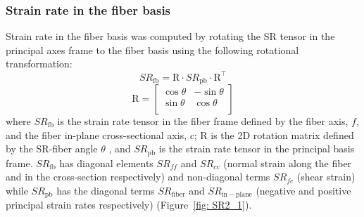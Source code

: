 \subsubsection{Strain rate in the fiber basis}
Strain rate in the fiber basis was computed by rotating the SR tensor in the principal axes frame to the fiber basis using the following rotational transformation:
\begin{equation}\label{eq: SR2_1}
SR_{\mathrm{fb}}=\mathrm{R}\cdot SR_{\mathrm{pb}} \cdot \mathrm{R}^\intercal
\end{equation}
\begin{equation}\label{eq: SR2_2}
\mathrm{R} = \left [
\begin{matrix}
\cos{\theta} & -\sin{\theta}\\
\sin{\theta} & \cos{\theta}\\
\end{matrix} \right]
\end{equation}
where $SR_{\mathrm{fb}}$ is the strain rate tensor in the fiber frame defined by the fiber axis, $f$, and the fiber in-plane cross-sectional axis, $c$; R is the 2D rotation matrix defined by the SR-fiber angle $\theta$ , and $SR_{\mathrm{pb}}$ is the strain rate tensor in the principal basis frame. 
$SR_{\mathrm{fb}}$ has diagonal elements $SR_{ff}$ and $SR_{cc}$ (normal strain along the fiber and in the cross-section respectively) and non-diagonal terms $SR_{fc}$ (shear strain) while $SR_{\mathrm{pb}}$ has the diagonal terms $SR_{\mathrm{fiber}}$ and $SR_{\mathrm{in-plane}}$ (negative and positive principal strain rates respectively) (Figure~\ref{fig: SR2_1}).
